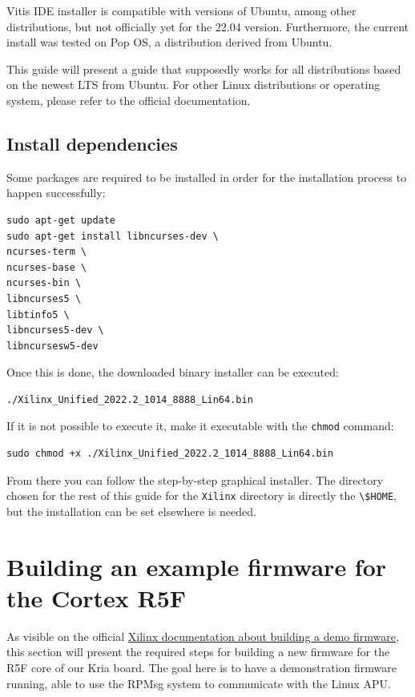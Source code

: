 \documentclass[10pt]{article}
\begin{document}
Vitis IDE installer is compatible with versions of Ubuntu, among other distributions,
but not officially yet for the 22.04 version.
Furthermore, the current install was tested on Pop OS, a distribution derived from Ubuntu.

This guide will present a guide that supposedly works for all distributions based on the newest
LTS from Ubuntu. For other Linux distributions or operating system, please refer to the official documentation.


\subsection{Install dependencies}
\label{sec:install-dependencies}
Some packages are required to be installed in order for the installation process to happen successfully:
\begin{tcolorbox}
\begin{verbatim}
sudo apt-get update
sudo apt-get install libncurses-dev \
ncurses-term \
ncurses-base \
ncurses-bin \
libncurses5 \
libtinfo5 \
libncurses5-dev \
libncursesw5-dev
\end{verbatim}
\end{tcolorbox}

Once this is done, the downloaded binary installer can be executed:
\begin{tcolorbox}
\begin{verbatim}
./Xilinx_Unified_2022.2_1014_8888_Lin64.bin
\end{verbatim}
\end{tcolorbox}

If it is not possible to execute it, make it executable with the \verb|chmod| command:
\begin{tcolorbox}
\begin{verbatim}
sudo chmod +x ./Xilinx_Unified_2022.2_1014_8888_Lin64.bin
\end{verbatim}
\end{tcolorbox}

From there you can follow the step-by-step graphical installer.
The directory chosen for the rest of this guide for the \verb|Xilinx| directory
is directly the \verb|\$HOME|, but the installation can be set elsewhere is needed.


\section{Building an example firmware for the Cortex R5F}
\label{sec:bulding-an-example}
As visible on the official \href{https://xilinx-wiki.atlassian.net/wiki/spaces/A/pages/1837006921/OpenAMP+Base+Hardware+Configurations\#Build-RPU-firmware}{Xilinx documentation about building a demo firmware}, this section will present the required steps for building a new firmware for the R5F core of our Kria board. The goal
here is to have a demonstration firmware running, able to use the RPMsg system to communicate with the Linux APU.
\end{document}

